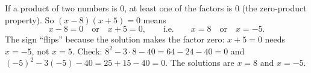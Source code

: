 If a product of two numbers is $0$, at least one of the factors is $0$ (the zero-product property). So $(x-8)(x+5)=0$ means
\[
x-8=0\quad\text{or}\quad x+5=0,\qquad\text{i.e.}\qquad x=8\quad\text{or}\quad x=-5 .
\]
The sign ``flips'' because the solution makes the factor zero: $x+5=0$ needs $x=-5$, not $x=5$. Check: $8^2-3\cdot8-40=64-24-40=0$ and $(-5)^2-3(-5)-40=25+15-40=0$. The solutions are $\boxed{x=8\text{ and }x=-5}$.
